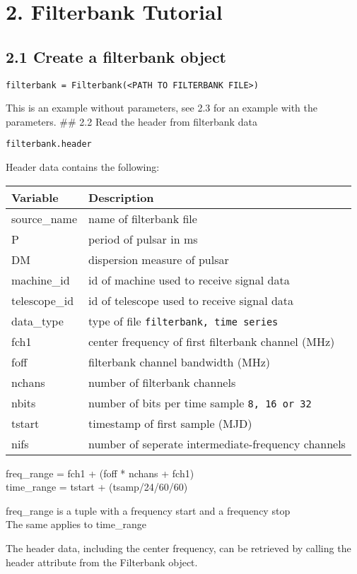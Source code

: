 \documentclass[]{article}
\begin{document}
\section{2. Filterbank Tutorial}\label{filterbank-tutorial}

\subsection{2.1 Create a filterbank
object}\label{create-a-filterbank-object}

\begin{verbatim}
filterbank = Filterbank(<PATH TO FILTERBANK FILE>)
\end{verbatim}

This is an example without parameters, see 2.3 for an example with the
parameters. \#\# 2.2 Read the header from filterbank data

\begin{verbatim}
filterbank.header
\end{verbatim}

Header data contains the following:

\begin{longtable}[]{@{}ll@{}}
\toprule
Variable & Description\tabularnewline
\midrule
\endhead
source\_name & name of filterbank file\tabularnewline
P & period of pulsar in ms\tabularnewline
DM & dispersion measure of pulsar\tabularnewline
machine\_id & id of machine used to receive signal data\tabularnewline
telescope\_id & id of telescope used to receive signal
data\tabularnewline
data\_type & type of file
\texttt{filterbank,\ time\ series}\tabularnewline
fch1 & center frequency of first filterbank channel (MHz)\tabularnewline
foff & filterbank channel bandwidth (MHz)\tabularnewline
nchans & number of filterbank channels\tabularnewline
nbits & number of bits per time sample
\texttt{8,\ 16\ or\ 32}\tabularnewline
tstart & timestamp of first sample (MJD)\tabularnewline
nifs & number of seperate intermediate-frequency channels\tabularnewline
\bottomrule
\end{longtable}

freq\_range = fch1 + (foff * nchans + fch1)\\
time\_range = tstart + (tsamp/24/60/60)

freq\_range is a tuple with a frequency start and a frequency stop\\
The same applies to time\_range

The header data, including the center frequency, can be retrieved by
calling the header attribute from the Filterbank object.
\end{document}
